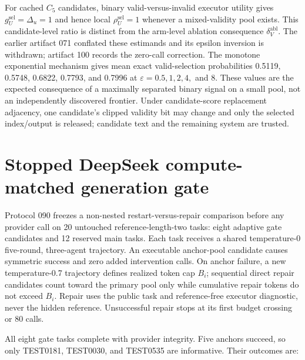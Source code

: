 For cached \(C_5\) candidates, binary valid-versus-invalid executor utility gives \(g_U^{\mathrm{sel}}=\Delta_u=1\) and hence local \(\rho_U^{\mathrm{sel}}=1\) whenever a mixed-validity pool exists. This candidate-level ratio is distinct from the arm-level ablation consequence \(\delta_V^{\mathrm{abl}}\). The earlier artifact 071 conflated these estimands and its epsilon inversion is withdrawn; artifact 100 records the zero-call correction. The monotone exponential mechanism gives mean exact valid-selection probabilities 0.5119, 0.5748, 0.6822, 0.7793, and 0.7996 at \(\varepsilon=0.5, 1, 2, 4,\) and \(8\). These values are the expected consequence of a maximally separated binary signal on a small pool, not an independently discovered frontier. Under candidate-score replacement adjacency, one candidate's clipped validity bit may change and only the selected index/output is released; candidate text and the remaining system are trusted.

\section{Stopped DeepSeek compute-matched generation gate}
\label{app:repair}

Protocol 090 freezes a non-nested restart-versus-repair comparison before any provider call on 20 untouched reference-length-two tasks: eight adaptive gate candidates and 12 reserved main tasks. Each task receives a shared temperature-0 five-round, three-agent trajectory. An executable anchor-pool candidate causes symmetric success and zero added intervention calls. On anchor failure, a new temperature-0.7 trajectory defines realized token cap \(B_i\); sequential direct repair candidates count toward the primary pool only while cumulative repair tokens do not exceed \(B_i\). Repair uses the public task and reference-free executor diagnostic, never the hidden reference. Unsuccessful repair stops at its first budget crossing or 80 calls.

All eight gate tasks complete with provider integrity. Five anchors succeed, so only TEST0181, TEST0030, and TEST0535 are informative. Their outcomes are:

\begin{center}
\end{center}

